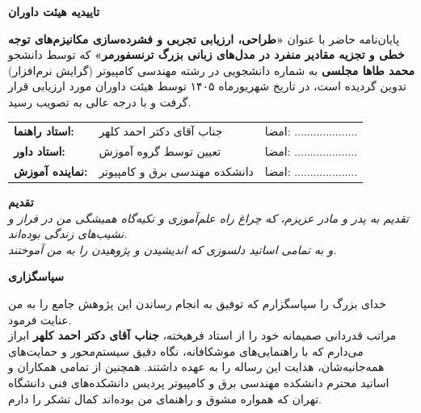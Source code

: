 \documentclass[12pt,a4paper]{report}
\theoremstyle{definition}
\begin{document}
\newpage
\thispagestyle{empty}
\vspace*{3cm}
\begin{center}
{\Large \textbf{تاییدیه هیئت داوران}}\\[1cm]
\end{center}
پایان‌نامه حاضر با عنوان \textbf{«طراحی، ارزیابی تجربی و فشرده‌سازی مکانیزم‌های توجه خطی و تجزیه مقادیر منفرد  در مدل‌های زبانی بزرگ ترنسفورمر»} که توسط دانشجو \textbf{محمد طاها مجلسی} به شماره دانشجویی  در رشته مهندسی کامپیوتر (گرایش نرم‌افزار) تدوین گردیده است، در تاریخ شهریورماه ۱۴۰۵ توسط هیئت داوران مورد ارزیابی قرار گرفت و با درجه عالی به تصویب رسید.\\[2cm]
\begin{tabular}{lll}
\textbf{استاد راهنما:} & جناب آقای دکتر احمد کلهر & امضا: .................... \\[1cm]
\textbf{استاد داور:} & تعیین توسط گروه آموزش & امضا: .................... \\[1cm]
\textbf{نماینده آموزش:} & دانشکده مهندسی برق و کامپیوتر & امضا: ....................
\end{tabular}

\newpage
\thispagestyle{empty}
\vspace*{4cm}
\begin{center}
{\Large \textbf{تقدیم}}\\[1cm]
\textit{تقدیم به پدر و مادر عزیزم، که چراغ راه علم‌آموزی و تکیه‌گاه همیشگی من در فراز و نشیب‌های زندگی بوده‌اند.}\\[0.5cm]
\textit{و به تمامی اساتید دلسوزی که اندیشیدن و پژوهیدن را به من آموختند.}
\end{center}

\newpage
\thispagestyle{empty}
\vspace*{4cm}
\begin{center}
{\Large \textbf{سپاسگزاری}}\\[1cm]
\end{center}
خدای بزرگ را سپاسگزارم که توفیق به انجام رساندن این پژوهش جامع را به من عنایت فرمود.\\[0.4cm]
مراتب قدردانی صمیمانه خود را از استاد فرهیخته، \textbf{جناب آقای دکتر احمد کلهر} ابراز می‌دارم که با راهنمایی‌های موشکافانه، نگاه دقیق سیستم‌محور و حمایت‌های همه‌جانبه‌شان، هدایت این رساله را به عهده داشتند. همچنین از تمامی همکاران و اساتید محترم دانشکده مهندسی برق و کامپیوتر پردیس دانشکده‌های فنی دانشگاه تهران که همواره مشوق و راهنمای من بوده‌اند کمال تشکر را دارم.

\newpage
{}
\end{document}
